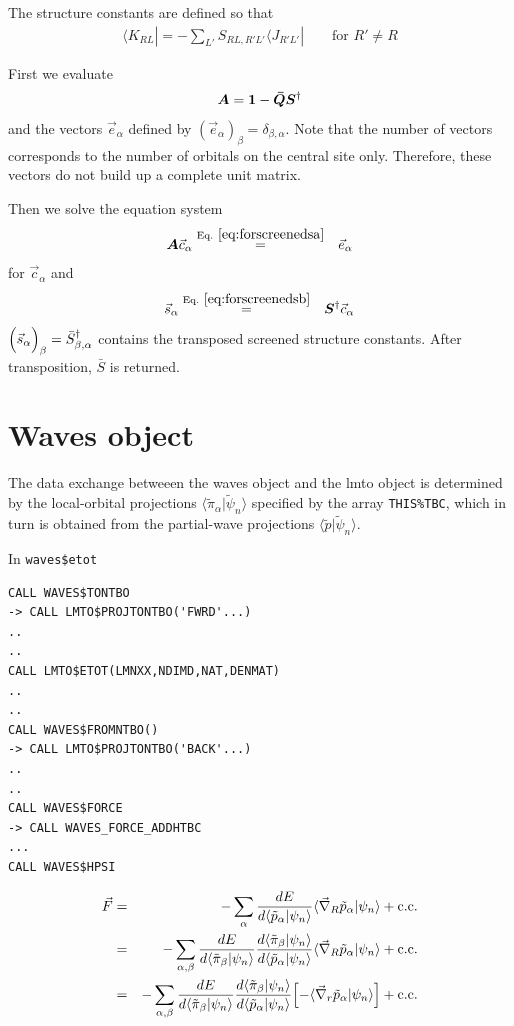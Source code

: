 \documentclass[11pt,a4paper]{report}
\begin{document}
The structure constants are defined so that
\begin{eqnarray}
\langle K_{RL}|=-\sum_{L'} S_{RL,R'L'}\langle J_{R'L'}|
\qquad\text{for $R'\neq R$}
\end{eqnarray}

First we evaluate 
\begin{eqnarray}
\bm{A}=\bm{1}-\bm{\bar{Q}}\bm{S}^\dagger
\end{eqnarray}
and the vectors $\vec{e}_\alpha$ defined by
$(\vec{e}_\alpha)_\beta=\delta_{\beta,\alpha}$. Note that the number
of vectors corresponds to the number of orbitals on the central site
only. Therefore, these vectors do not build up a complete unit matrix.

Then we solve the equation system
\begin{eqnarray}
\mat{A}\vec{c}_\alpha
&\eqrel{eq:forscreenedsa}{=}&
\vec{e}_\alpha
\end{eqnarray}
for $\vec{c}_\alpha$ and
\begin{eqnarray}
\vec{s}_\alpha&\eqrel{eq:forscreenedsb}{=}&
\mat{S}^\dagger\vec{c}_\alpha
\end{eqnarray}
$\Bigl(\vec{s}_\alpha\Bigr)_\beta=\bar{S}^\dagger_{\beta,\alpha}$
contains the transposed screened structure constants. After
transposition, $\bar{S}$ is returned.

\section{Waves object}
The data exchange betweeen the waves object and the lmto object is
determined by the local-orbital projections
$\langle\tilde{\pi}_\alpha|\tilde{\psi}_n\rangle$ specified by the
array \verb|THIS%TBC|, which in turn is obtained from the partial-wave
projections $\langle\tilde{p}|\tilde{\psi}_n\rangle$.



In \verb|waves$etot|
\begin{verbatim}
CALL WAVES$TONTBO
-> CALL LMTO$PROJTONTBO('FWRD'...)
..
..
CALL LMTO$ETOT(LMNXX,NDIMD,NAT,DENMAT)
..
..
CALL WAVES$FROMNTBO()
-> CALL LMTO$PROJTONTBO('BACK'...)
..
..
CALL WAVES$FORCE
-> CALL WAVES_FORCE_ADDHTBC
...
CALL WAVES$HPSI
\end{verbatim}


\begin{eqnarray*}
\vec{F}&=&
-\sum_\alpha
\frac{dE}{d\langle\tilde{p}_\alpha|\psi_n\rangle}
\langle\vec{\nabla}_R\tilde{p}_\alpha|\psi_n\rangle
+\mathrm{c.c.}
\nonumber\\
&=&-\sum_{\alpha,\beta}
\frac{dE}{d\langle\tilde{\pi}_\beta|\psi_n\rangle}
\frac{d\langle\tilde{\pi}_\beta|\psi_n\rangle}
{d\langle\tilde{p}_\alpha|\psi_n\rangle}
\langle\vec{\nabla}_R\tilde{p}_\alpha|\psi_n\rangle
+\mathrm{c.c.}
\nonumber\\
&=&-\sum_{\alpha,\beta}
\frac{dE}{d\langle\tilde{\pi}_\beta|\psi_n\rangle}
\frac{d\langle\tilde{\pi}_\beta|\psi_n\rangle}
{d\langle\tilde{p}_\alpha|\psi_n\rangle}
\Bigl[-\langle\vec{\nabla}_r\tilde{p}_\alpha|\psi_n\rangle\Bigr]
+\mathrm{c.c.}
\end{eqnarray*}
\end{document}
